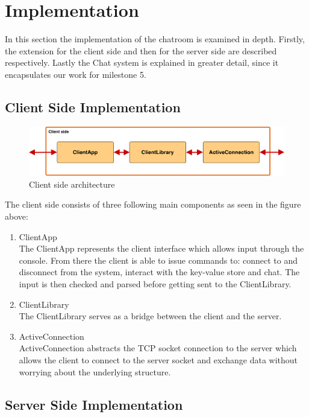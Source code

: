 \section{Implementation}
\label{sec:implementation}

In this section the implementation of the chatroom is examined in depth. Firstly, the extension for the client side and then for the server side are described respectively. Lastly the Chat system is explained in greater detail, since it encapsulates our work for milestone 5.

\subsection{Client Side Implementation}
\label{sec:Implementation_clintside}

\begin{figure}[h]
	\centering
	\includegraphics[width=\linewidth]{figures/client_arch.png}
	\caption{Client side architecture}
	\label{fig:client_arch}
\end{figure}

The client side consists of three following main components as seen in the figure above:
\begin{enumerate}
  \item ClientApp\\
   The ClientApp represents the client interface which allows input through the console. From there the client is able to issue commands to: connect to and disconnect from the system, interact with the key-value store and chat. The input is then checked and parsed before getting sent to the ClientLibrary.
  \item ClientLibrary\\
The ClientLibrary serves as a bridge between the client and the server.
  \item ActiveConnection\\
  ActiveConnection abstracts the TCP socket connection to the server which allows the client to connect to the server socket and exchange data without worrying about the underlying structure.
\end{enumerate}
 
\subsection{Server Side Implementation}
\label{sec:implementation_serverside}

